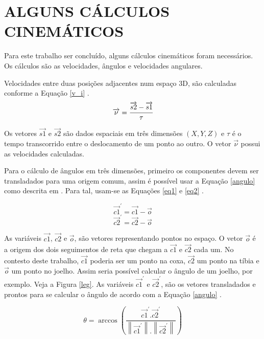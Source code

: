\section{ALGUNS CÁLCULOS CINEMÁTICOS}
Para este trabalho ser concluído, alguns cálculos cinemáticos foram necessários. Os cálculos são  as velocidades, ângulos e velocidades angulares.

Velocidades entre duas posições adjacentes num espaço 3D, são calculadas conforme a Equação \ref{v_i} \cite{Poole2011}.
\begin{equation}
	\label{v_i}
	\overrightarrow{\nu} =  \cfrac{\overrightarrow{s2} - \overrightarrow{s1}}{\tau}
\end{equation}

Os vetores $\overrightarrow{s1}$ e $\overrightarrow{s2}$ são dados espaciais em três dimensões $(X, Y, Z)$ e $\tau$ é o tempo transcorrido entre o deslocamento de um ponto ao outro. O vetor $\overrightarrow{\nu}$ possui as velocidades calculadas.

Para o cálculo de ângulos em três dimensões, primeiro os componentes devem ser transladados para uma origem comum, assim é possível usar a 
Equação \ref{angulo} como descrita em . 
Para tal, usam-se as Equações \ref{eq1} e \ref{eq2} \cite{Poole2011}.

\begin{equation}
	\label{eq1}
	\overrightarrow{c1}^\prime =  \overrightarrow{c1} - \overrightarrow{o}
\end{equation}
\begin{equation}
	\label{eq2}
	\overrightarrow{c2}^\prime =  \overrightarrow{c2} - \overrightarrow{o}
\end{equation}

As variáveis $\overrightarrow{c1}$, $\overrightarrow{c2}$ e $\overrightarrow{o}$, são vetores representando pontos no espaço. 
O vetor $\overrightarrow{o}$ é a origem dos dois seguimentos de reta que chegam a $\overrightarrow{c1}$ e $\overrightarrow{c2}$ cada um. 
No contesto deste trabalho, $\overrightarrow{c1}$ poderia ser um ponto na coxa, $\overrightarrow{c2}$ um ponto na tíbia e $\overrightarrow{o}$ um ponto no joelho. 
Assim seria possível calcular o ângulo de um joelho, por exemplo. Veja a Figura \ref{leg}. 
As variáveis $\overrightarrow{c1}^\prime$ e $\overrightarrow{c2}^\prime$, são os vetores transladados e prontos para se calcular o ângulo de acordo com a Equação \ref{angulo} \cite{Edwards2006}.

\begin{equation}
	\label{angulo}
	\theta = \arccos{(\frac{\overrightarrow{c1}^\prime.\overrightarrow{c2}^\prime} 
	{  \left \| \overrightarrow{c1}^\prime \right \|. \left \| \overrightarrow{c2}^\prime \right \|} )} 
\end{equation}

